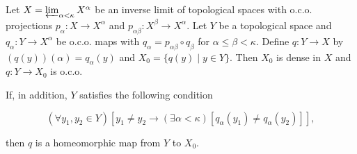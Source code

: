 Let $X = \varprojlim_{\alpha < \kappa} X^{\alpha}$ be an inverse limit of topological spaces with o.c.o. projections $p_{\alpha}: X \to X^{\alpha}$ and $p_{\alpha\beta}: X^{\beta} \to X^{\alpha}$. Let $Y$ be a topological space and $q_{\alpha}: Y \to X^{\alpha}$ be o.c.o. maps with $q_{\alpha} = p_{\alpha\beta} \circ q_{\beta}$ for $\alpha \leq \beta < \kappa$. Define $q: Y \to X$ by $(q(y))(\alpha) = q_{\alpha}(y)$ and $X_0 = \{q(y) \mid y \in Y\}$. Then $X_0$ is dense in $X$ and $q: Y \to X_0$ is o.c.o.

If, in addition, $Y$ satisfies the following condition

$$(\forall y_1, y_2 \in Y)[y_1 \neq y_2 \rightarrow (\exists \alpha < \kappa)[q_{\alpha}(y_1) \neq q_{\alpha}(y_2)]],$$

then $q$ is a homeomorphic map from $Y$ to $X_0$.$$
